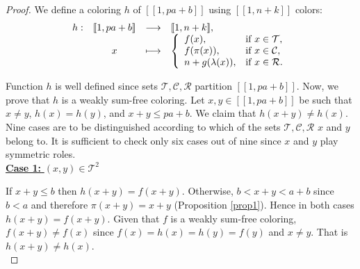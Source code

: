 \documentclass[final,onefignum,onetabnum]{siamart190516}
\begin{document}
\begin{proof}
We define a coloring \(h\) of \([\![1, p a + b]\!]\) using \( [\![1,n+k]\!]\) colors:
\[
\begin{array}{c c c l}
	h : & [\![1, p a + b]\!] & \longrightarrow & [\![1,n+k]\!],\\
	& x & \longmapsto &
	\left\{ \begin{array}{l l}
		f(x), & \text{if}~x \in \mathcal{T}, \\
		f(\pi(x)), & \text{if}~x \in \mathcal{C}, \\
		n + g(\lambda(x)), & \text{if}~x \in \mathcal{R}.
	\end{array} \right.
\end{array}
\]

Function \(h\) is well defined since sets \(\mathcal{T}, \mathcal{C}, \mathcal{R}\) partition \([\![1, p a + b]\!]\).
Now, we prove that \(h\) is a weakly sum-free coloring. Let \(x,y \in [\![1, p a + b]\!]\) be such that \(x \neq y\),
\(h(x) = h(y)\), and \(x+y \leqslant p a+ b\). We claim that \(h(x+y) \neq h(x)\). Nine cases are to be distinguished
according to which of the sets \(\mathcal{T}, \mathcal{C}, \mathcal{R}\) \(x\) and \(y\) belong to. It is
sufficient to check only six cases out of nine since \(x\) and \(y\) play symmetric roles. \\

\noindent \underline{\textbf{Case 1:} \((x,y) \in \mathcal{T}^2\)}
\par
If \(x + y \leqslant b\) then \(h(x+y)=f(x+y)\). Otherwise, \(b < x+y < a+b\) since \(b < a\) and
therefore \(\pi(x + y) = x +y\) (Proposition \ref{prop1}). Hence in both cases \(h(x+y)=f(x+y)\). Given that
\(f\) is a weakly sum-free coloring, \(f(x + y) \neq f(x)\) since \(f(x)=h(x)=h(y)=f(y)\) and \(x \neq y \). That
is \(h(x + y) \neq h(x)\). \\


\end{proof}
\end{document}
